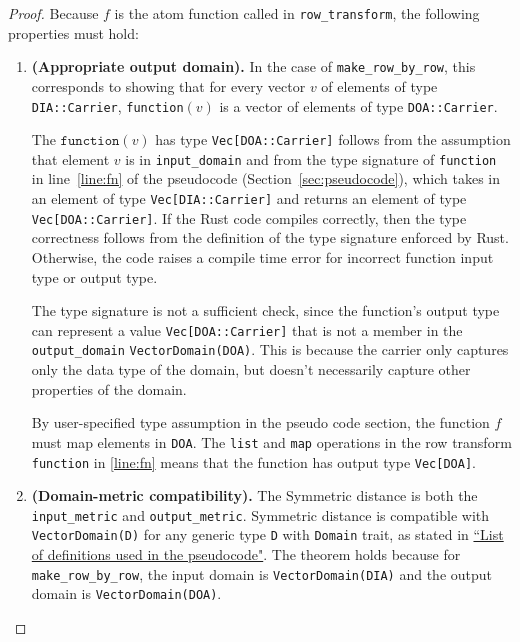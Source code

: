 \documentclass[11pt,a4paper]{article}
\newcommand{\function}{\texttt{function}}
\begin{document}
\begin{proof}
Because $f$ is the atom function called in \texttt{row\_transform}, the following properties must hold:

\begin{enumerate}
\item \textbf{(Appropriate output domain).} In the case of \texttt{make\_row\_by\_row}, this corresponds to showing that for every vector $v$ of elements of type \texttt{DIA::Carrier}, \texttt{function}$(v)$ is a vector of elements of type \texttt{DOA::Carrier}. 

The $\function(v)$ has type \texttt{Vec[DOA::Carrier]} follows from the assumption that element $v$ is in \texttt{input\_domain} and from the type signature of \texttt{function} in line~\ref{line:fn} of the pseudocode (Section~\ref{sec:pseudocode}), which takes in an element of type \texttt{Vec[DIA::Carrier]} and returns an element of type \texttt{Vec[DOA::Carrier]}. If the Rust code compiles correctly, then the type correctness follows from the definition of the type signature enforced by Rust. Otherwise, the code raises a compile time error for incorrect function input type or output type. 

The type signature is not a sufficient check, since the function's output type can represent a value \texttt{Vec[DOA::Carrier]} that is not a member in the \texttt{output\_domain} \texttt{VectorDomain(DOA)}. This is because the carrier only captures only the data type of the domain, but doesn't necessarily capture other properties of the domain. 

By user-specified type assumption in the pseudo code section, the function $f$ must map elements in \texttt{DOA}. The \texttt{list} and \texttt{map} operations in the row transform \texttt{function} in \ref{line:fn} means that the function has output type \texttt{Vec[DOA]}.






\item \textbf{(Domain-metric compatibility).} The Symmetric distance is both the \texttt{input\_metric} and \texttt{output\_metric}. Symmetric distance is compatible with \texttt{VectorDomain(D)} for any generic type \texttt{D} with \texttt{Domain} trait, as stated in \href{https://www.overleaf.com/project/60d215bf90b337ac02200a99}{``List of definitions used in the pseudocode"}. The theorem holds because for \texttt{make\_row\_by\_row}, the input domain is \texttt{VectorDomain(DIA)} and the output domain is \texttt{VectorDomain(DOA)}. 



\end{enumerate}
\end{proof}
\end{document}
